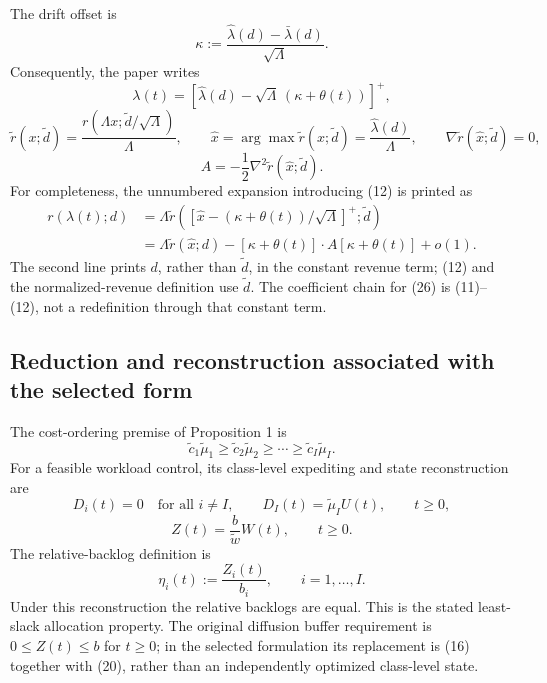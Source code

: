 \documentclass[11pt]{article}
\begin{document}
The drift offset is
\begin{equation}
\kappa:=\frac{\hat\lambda(d)-\bar\lambda(d)}{\sqrt\Lambda}.
\tag{11}
\end{equation}
Consequently, the paper writes
\[
\lambda(t)=[\hat\lambda(d)-\sqrt\Lambda\,(\kappa+\theta(t))]^+,
\]
\[
\tilde r(x;\tilde d)=\frac{r(\Lambda x;\tilde d/\sqrt\Lambda)}{\Lambda},
\qquad
\hat x=\arg\max\tilde r(x;\tilde d)=\frac{\hat\lambda(d)}{\Lambda},
\qquad
\nabla\tilde r(\hat x;\tilde d)=0,
\]
\begin{equation}
A=-\frac12\nabla^2\tilde r(\hat x;\tilde d).
\tag{12}
\end{equation}
For completeness, the unnumbered expansion introducing (12) is printed as
\[
\begin{aligned}
r(\lambda(t);d)
&=\Lambda\tilde r\left([\hat x-(\kappa+\theta(t))/\sqrt\Lambda]^+;\tilde d\right)\\
&=\Lambda\tilde r(\hat x;d)
-[\kappa+\theta(t)]\cdot A[\kappa+\theta(t)]+o(1).
\end{aligned}
\]
The second line prints \(d\), rather than \(\tilde d\), in the constant revenue term; (12) and the normalized-revenue definition use \(\tilde d\). The coefficient chain for (26) is (11)--(12), not a redefinition through that constant term.

\subsection*{Reduction and reconstruction associated with the selected form}

The cost-ordering premise of Proposition 1 is
\[
\tilde c_1\tilde\mu_1\geq\tilde c_2\tilde\mu_2
\geq\cdots\geq\tilde c_I\tilde\mu_I.
\]
For a feasible workload control, its class-level expediting and state reconstruction are
\begin{equation}
D_i(t)=0\quad\text{for all }i\ne I,
\qquad D_I(t)=\tilde\mu_I U(t),\qquad t\geq0,
\tag{19}
\end{equation}
\begin{equation}
Z(t)=\frac b{\tilde w}W(t),\qquad t\geq0.
\tag{20}
\end{equation}
The relative-backlog definition is
\[
\eta_i(t):=\frac{Z_i(t)}{b_i},\qquad i=1,\ldots,I.
\]
Under this reconstruction the relative backlogs are equal. This is the stated least-slack allocation property. The original diffusion buffer requirement is \(0\leq Z(t)\leq b\) for \(t\geq0\); in the selected formulation its replacement is (16) together with (20), rather than an independently optimized class-level state.
\end{document}
